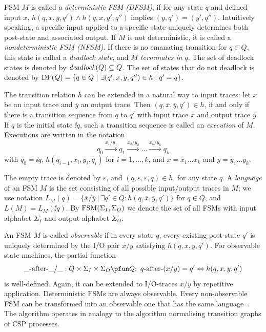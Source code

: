 FSM $M$ is called a \emph{deterministic FSM (DFSM)}, if for any state $q$ and defined input $x$,
$h(q,x,y,q') \wedge h(q,x,y',q'')$ implies $(y,q') = (y',q'')$. Intuitively speaking, a specific 
input applied to a specific state uniquely determines both post-state and associated output.
If $M$ is not deterministic, it is called a \emph{nondeterministic FSM (NFSM)}.  
If there is no emanating transition for $q\in Q$, this state is called a \emph{deadlock state}, and
\emph{$M$ terminates in $q$}. The set of deadlock states is denoted by ${\it deadlock}(Q)\subseteq Q$. 
The set of states that do not deadlock is denoted by 
$\text{DF}(Q) = \{ q\in Q~|~\exists (q',x,y,q'')\in h: q' = q \}$.

 
The transition relation $h$ can be extended in a natural way to input traces:  
let $\overline{x}$ be an input trace and $\overline{y}$ an output trace. Then 
$(q,\overline{x},\overline{y},q')\in h$, if and only if there is a transition sequence
from $q$ to $q'$ with input trace $\overline{x}$ and output trace $\overline{y}$. 
If $q$ is the initial state $\ii{q}$, such a transition sequence is called an \emph{execution} of $M$. Executions are written in the notation 
$$
q_0 \xrightarrow{x_1/y_1} q_1 \xrightarrow{x_2/y_2} \dots \xrightarrow{x_{k}/y_{k}} q_{k}
$$ 
with $q_0 = \ii{q}$, $h(q_{i-1},x_i,y_i,q_{i})$ for $i = 1,\dots,k$, and
$\overline{x} = x_1\dots x_k$ and $\overline{y} = y_1\dots y_k$.

The empty trace is denoted by $\varepsilon$, and
$(q,\varepsilon,\varepsilon,q)\in h$, for any state $q$.
A \emph{language}  of an FSM $M$  is the set consisting of all possible input/output
traces in $M$; we use notation
 $L_M(q)=\{\overline{x}/\overline{y}~|~\exists q'\in Q: h(q,\overline{x},\overline{y},q')\}$ for $q\in Q$, and  $L(M)=L_M(\ii{q})$.
By $\text{FSM}(\Sigma_I,\Sigma_O)$ we denote the set of all FSMs with input alphabet $\Sigma_I$ and
output alphabet $\Sigma_O$.

An FSM $M$ is called \emph{observable} if in every state $q$, every existing post-state $q'$ is uniquely determined by the I/O pair $x/y$ satisfying $h(q,x,y,q')$. For
observable state machines, the partial function
$$
\_ \after\_ /\_ : Q\times\Sigma_I\times \Sigma_O \pfun Q;\    
q\after(x/y) = q' \Leftrightarrow h(q,x,y,q')
$$
is well-defined. Again, it can be extended to I/O-traces $\overline x/\overline y$
by repetitive application.
Deterministic FSMs are always observable. Every non-observable FSM can be transformed into an observable one that has the same language~\cite{PeleskaHuangLectureNotesMBT}. The algorithm 
operates in analogy to the algorithm normalising transition graphs of CSP processes.

